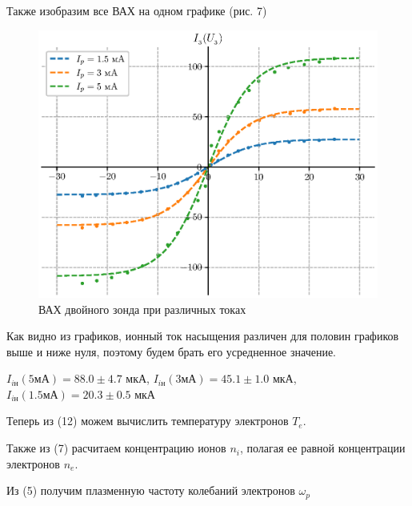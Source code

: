\documentclass[12pt,a4paper]{article}
\begin{document}
Также изобразим все ВАХ на одном графике (рис. 7)

\begin{figure}[H]
    \centering
    \includegraphics[width=0.7\linewidth]{pics/all.eps}
    \caption{ВАХ двойного зонда при различных токах}
\end{figure}
Как видно из графиков, ионный ток насыщения различен для половин графиков выше и ниже нуля, поэтому будем брать его усредненное значение.

$I_{iн}(5мА) = 88.0 \pm 4.7$ мкА, $I_{iн}(3мА) = 45.1 \pm 1.0$ мкА, $I_{iн}(1.5мА) = 20.3 \pm 0.5$ мкА


 

Теперь из (12) можем вычислить температуру электронов $T_e$.

Также из (7) расчитаем концентрацию ионов $n_i$, полагая ее равной концентрации электронов $n_e$.

Из (5) получим плазменную частоту колебаний электронов $\omega_p$
\end{document}
